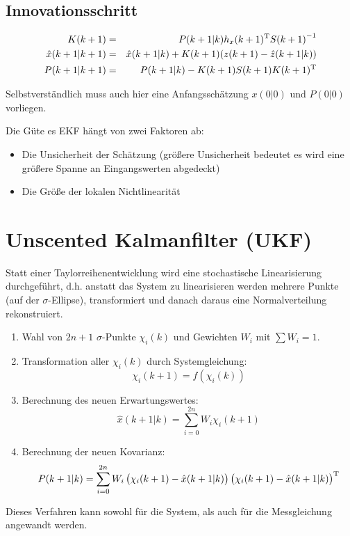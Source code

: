 \subsection{Innovationsschritt}
\begin{eqnarray*}
    K(k+1) &=& P(k+1|k) h_x(k+1)^\text{T} {S(k+1)}^{-1} \\
    \hat{x}(k+1|k+1) &=& \hat{x}(k+1|k) + K(k+1) (z(k+1) - \hat{z}(k+1|k)) \\
    P(k+1|k+1) &=& P(k+1|k) - K(k+1)S(k+1)K(k+1)^\text{T}
\end{eqnarray*}

Selbstverständlich muss auch hier eine Anfangsschätzung $x(0|0)$ und $P(0|0)$ vorliegen.

Die Güte es EKF hängt von zwei Faktoren ab:
\begin{itemize}
    \item Die Unsicherheit der Schätzung (größere Unsicherheit bedeutet es wird eine größere Spanne an Eingangswerten
        abgedeckt)
    \item Die Größe der lokalen Nichtlinearität
\end{itemize}

\section{Unscented Kalmanfilter (UKF)}
Statt einer Taylorreihenentwicklung wird eine \glqq{}stochastische\grqq{} Linearisierung durchgeführt, d.h. anstatt das System
zu linearisieren werden mehrere Punkte (auf der $\sigma$-Ellipse), transformiert und danach daraus eine 
Normalverteilung rekonstruiert.

\begin{enumerate}
    \item Wahl von $2n+1$ $\sigma$-Punkte $\chi_i(k)$ und Gewichten $W_i$ mit $\sum W_i = 1$.
    \item Transformation aller $\chi_i(k)$ durch Systemgleichung:
        \begin{equation*}
            \chi_i(k+1) = f(\chi_i(k))
        \end{equation*}
    \item Berechnung des neuen Erwartungswertes:
        \begin{equation*}
            \hat{x}(k+1|k) = \sum_{i=0}^{2n} W_i \chi_i(k+1)
        \end{equation*}
    \item Berechnung der neuen Kovarianz:
        \begin{equation*}
            P(k+1|k) = \sum_{i=0}^{2n} W_i \left(\chi_i(k+1) - \hat{x}(k+1|k) \right) 
                \left(\chi_i(k+1) - \hat{x}(k+1|k) \right)^\text{T}
        \end{equation*}
\end{enumerate}
Dieses Verfahren kann sowohl für die System, als auch für die Messgleichung angewandt werden.

